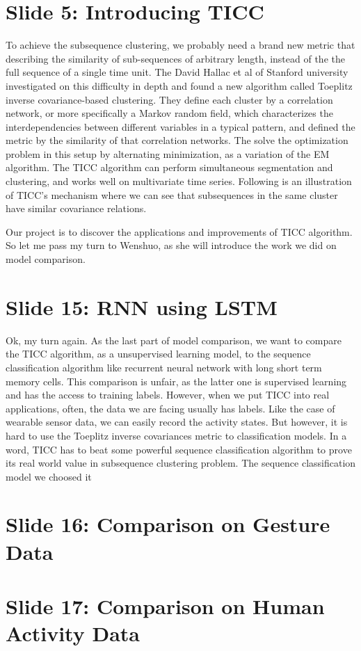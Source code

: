 \documentclass[]{article}
\begin{document}
\section{Slide 5: Introducing TICC}
To achieve the subsequence clustering, we probably need a brand new metric that describing the similarity of sub-sequences of arbitrary length, instead of the the full sequence of a single time unit. The David Hallac et al of Stanford university investigated on this difficulty in depth and found a new algorithm called Toeplitz inverse covariance-based clustering. They define each cluster by a correlation network, or more specifically a Markov random field, which characterizes the interdependencies between different variables in a typical pattern, and defined the metric by the similarity of that correlation networks. The solve the optimization problem in this setup by alternating minimization, as a variation of the EM algorithm. The TICC algorithm can perform simultaneous segmentation and clustering, and works well on multivariate time series. Following is an illustration of TICC's mechanism where we can see that subsequences in the same cluster have similar covariance relations.

Our project is to discover the applications and improvements of TICC algorithm. So let me pass my turn to Wenshuo, as she will introduce the work we did on model comparison. 

\section{Slide 15: RNN using LSTM}
Ok, my turn again. As the last part of model comparison, we want to compare the TICC algorithm, as a unsupervised learning model, to the sequence classification algorithm like recurrent neural network with long short term memory cells. This comparison is unfair, as the latter one is supervised learning and has the access to training labels. However, when we put TICC into real applications, often, the data we are facing usually has labels. Like the case of wearable sensor data, we can easily record the activity states. But however, it is hard to use the Toeplitz inverse covariances metric to classification models. In a word, TICC has to beat some powerful sequence classification algorithm to prove its real world value in subsequence clustering problem. The sequence classification model we choosed it 


\section{Slide 16: Comparison on Gesture Data}


\section{Slide 17: Comparison on Human Activity Data}

 
\end{document}
